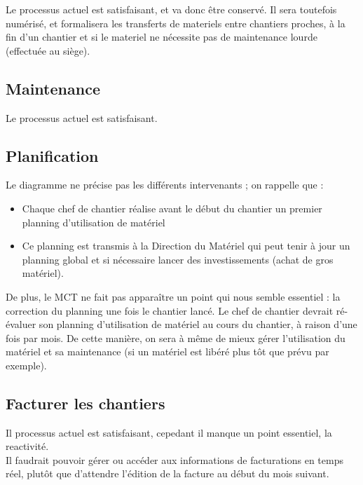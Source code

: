 \documentclass[a4paper]{article}
\begin{document}

Le processus actuel est satisfaisant, et va donc être conservé. Il sera
toutefois numérisé, et formalisera les transferts de materiels entre
chantiers proches, à la fin d'un chantier et si le materiel ne nécessite
pas de maintenance lourde (effectuée au siège).


\subsection{Maintenance}

Le processus actuel est satisfaisant.

\subsection{Planification}

Le diagramme ne précise pas les différents intervenants ; on rappelle que :
\begin{itemize}
\item Chaque chef de chantier réalise avant le début du chantier un premier
planning d'utilisation de matériel
\item Ce planning est transmis à la Direction du Matériel qui peut tenir à
jour un planning global et si nécessaire lancer des investissements (achat
de gros matériel).
\end{itemize}

\vskip 6pt

De plus, le MCT ne fait pas apparaître un point qui nous semble essentiel :
la correction du planning une fois le chantier lancé. Le chef de chantier
devrait ré-évaluer son planning d'utilisation de matériel au cours du
chantier, à raison d'une fois par mois. De cette manière, on sera à même de
mieux gérer l'utilisation du matériel et sa maintenance (si un matériel est
libéré plus tôt que prévu par exemple).


\subsection{Facturer les chantiers}

Il processus actuel est satisfaisant, cepedant il manque un point essentiel,
la reactivité. \\
Il faudrait pouvoir gérer ou accéder aux informations de facturations en 
temps réel, plutôt que d’attendre l’édition de la facture au début du 
mois suivant.
\end{document}
